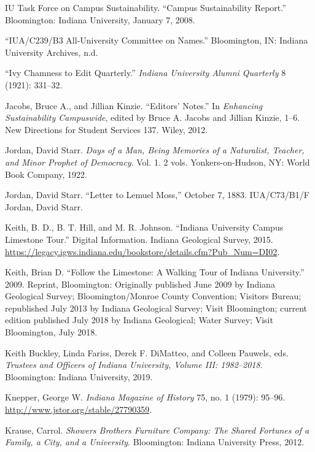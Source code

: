 \documentclass[
  american,
  letterpaper,
]{scrreprt}
\newlength{\cslhangindent}
\newenvironment{CSLReferences}[2] %
 {\begin{list}{}{%
  \setlength{\itemindent}{0pt}
  \setlength{\leftmargin}{0pt}
  \setlength{\parsep}{0pt}
  \ifodd #1
   \setlength{\leftmargin}{\cslhangindent}
   \setlength{\itemindent}{-1\cslhangindent}
  \fi
  \setlength{\itemsep}{#2\baselineskip}}}
 {\end{list}}
\begin{document}
\begin{CSLReferences}{1}{0}
IU Task Force on Campus Sustainability. {``Campus Sustainability
Report.''} Bloomington: Indiana University, January 7, 2008.

{``IUA/C239/B3 All-University Committee on Names.''} Bloomington, IN:
Indiana University Archives, n.d.

{``Ivy Chamness to Edit Quarterly.''} \emph{Indiana University Alumni
Quarterly} 8 (1921): 331--32.

Jacobs, Bruce A., and Jillian Kinzie. {``Editors' Notes.''} In
\emph{Enhancing Sustainability Campuswide}, edited by Bruce A. Jacobs
and Jillian Kinzie, 1--6. New Directions for Student Services 137.
Wiley, 2012.

Jordan, David Starr. \emph{Days of a Man, Being Memories of a
Naturalist, Teacher, and Minor Prophet of Democracy}. Vol. 1. 2 vols.
Yonkers-on-Hudson, NY: World Book Company, 1922.

Jordan, David Starr. {``Letter to Lemuel Moss,''} October 7, 1883.
IUA/C73/B1/F Jordan, David Starr.

Keith, B. D., B. T. Hill, and M. R. Johnson. {``Indiana University
Campus Limestone Tour.''} Digital Information. Indiana Geological
Survey, 2015.
\url{https://legacy.igws.indiana.edu/bookstore/details.cfm?Pub_Num=DI02}.

Keith, Brian D. {``Follow the Limestone: A Walking Tour of Indiana
University.''} 2009. Reprint, Bloomington: Originally published June
2009 by Indiana Geological Survey; Bloomington/Monroe County Convention;
Visitors Bureau; republished July 2013 by Indiana Geological Survey;
Visit Bloomington; current edition published July 2018 by Indiana
Geological; Water Survey; Visit Bloomington, July 2018.

Keith Buckley, Linda Fariss, Derek F. DiMatteo, and Colleen Pauwels,
eds. \emph{Trustees and Officers of Indiana University, Volume III:
1982--2018}. Bloomington: Indiana University, 2019.

Knepper, George W. \emph{Indiana Magazine of History} 75, no. 1 (1979):
95--96. \url{http://www.jstor.org/stable/27790359}.

Krause, Carrol. \emph{Showers Brothers Furniture Company: The Shared
Fortunes of a Family, a City, and a University}. Bloomington: Indiana
University Press, 2012.


\end{CSLReferences}
\end{document}
